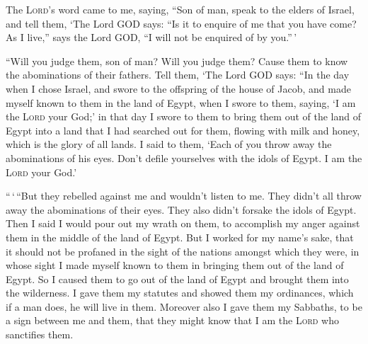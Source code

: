  The \textsc{Lord}'s word came to me, saying,
 ``Son of man, speak to the elders of Israel, and tell
them, `The Lord GOD says: ``Is it to enquire of me that you have come?
As I live,'' says the Lord GOD, ``I will not be enquired of by you.''\,'

 ``Will you judge them, son of man? Will you judge them?
Cause them to know the abominations of their fathers. 
Tell them, `The Lord GOD says: ``In the day when I chose Israel, and
swore to the offspring of the house of Jacob, and made myself known to
them in the land of Egypt, when I swore to them, saying, `I am the
\textsc{Lord} your God;'  in that day I swore to them to
bring them out of the land of Egypt into a land that I had searched out
for them, flowing with milk and honey, which is the glory of all lands.
 I said to them, `Each of you throw away the abominations
of his eyes. Don't defile yourselves with the idols of Egypt. I am the
\textsc{Lord} your God.'

 ``\,`\,``But they rebelled against me and wouldn't listen
to me. They didn't all throw away the abominations of their eyes. They
also didn't forsake the idols of Egypt. Then I said I would pour out my
wrath on them, to accomplish my anger against them in the middle of the
land of Egypt.  But I worked for my name's sake, that it
should not be profaned in the sight of the nations amongst which they
were, in whose sight I made myself known to them in bringing them out of
the land of Egypt.  So I caused them to go out of the
land of Egypt and brought them into the wilderness.  I
gave them my statutes and showed them my ordinances, which if a man
does, he will live in them.  Moreover also I gave them my
Sabbaths, to be a sign between me and them, that they might know that I
am the \textsc{Lord} who sanctifies them.

